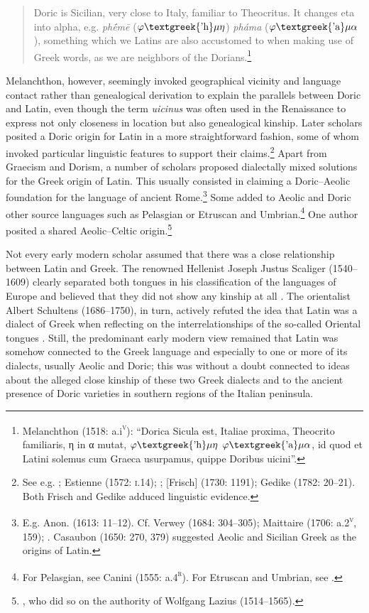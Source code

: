 \documentclass[output=paper]{langsci/langscibook}
\begin{document}
\begin{quote}
Doric is Sicilian, very close to Italy, familiar to Theocritus. It changes eta into alpha, e.g. \textit{phḗmē} ($\varphi \text{\textgreek{'h}}\mu \eta $) \textit{pháma} ($\varphi \text{\textgreek{'a}}\mu \alpha $), something which we Latins are also accustomed to when making use of Greek words, as we are neighbors of the Dorians.\footnote{Melanchthon (1518: a.i\textsc{\textsuperscript{v}}): “Dorica Sicula est, Italiae proxima, Theocrito familiaris, η in α mutat, $\varphi \text{\textgreek{'h}}\mu \eta $ $\varphi \text{\textgreek{'a}}\mu \alpha $, id quod et Latini solemus cum Graeca usurpamus, quippe Doribus uicini”.}
\end{quote}

Melanchthon, however, seemingly invoked geographical vicinity and language contact rather than genealogical derivation to explain the parallels between Doric and Latin, even though the term \textit{uicinus} was often used in the Renaissance to express not only closeness in location but also genealogical kinship. Later scholars posited a Doric origin for Latin in a more straightforward fashion, some of whom invoked particular linguistic features to support their claims.\footnote{See e.g. \citet[10]{Sylvius1531}; Estienne (1572: \textsc{i.}14); \citet[208]{Merula1605}; [Frisch] (1730: 1191); Gedike (1782: 20–21). Both Frisch and Gedike adduced linguistic evidence.} Apart from Graecism and Dorism, a number of scholars proposed dialectally mixed solutions for the Greek origin of Latin. This usually consisted in claiming a Doric–Aeolic foundation for the language of ancient Rome.\footnote{E.g. Anon. (1613: 11–12). Cf. Verwey (1684: 304–305); Maittaire (1706: a.2\textsc{\textsuperscript{v}}, 159); \citet[161]{Gesner1774}. Casaubon (1650: 270, 379) suggested Aeolic and Sicilian Greek as the origins of Latin.} Some added to Aeolic and Doric other source languages such as Pelasgian or Etruscan and Umbrian.\footnote{For Pelasgian, see Canini (1555: a.4\textsc{\textsuperscript{r}}). For Etruscan and Umbrian, see \citet[39]{Rüdiger1782}.} One author posited a shared Aeolic–Celtic origin.\footnote{\citet[13]{Nicolson1715}, who did so on the authority of Wolfgang Lazius (1514–1565).}

Not every early modern scholar assumed that there was a close relationship between Latin and Greek. The renowned Hellenist Joseph Justus Scaliger (1540–1609) clearly separated both tongues in his classification of the languages of Europe and believed that they did not show any kinship at all \citep{Scaliger1610}. The orientalist Albert Schultens (1686–1750), in turn, actively refuted the idea that Latin was a dialect of Greek when reflecting on the interrelationships of the so-called Oriental tongues \citep[109]{Schultens1738b}. Still, the predominant early modern view remained that Latin was somehow connected to the Greek language and especially to one or more of its dialects, usually Aeolic and Doric; this was without a doubt connected to ideas about the alleged close kinship of these two Greek dialects and to the ancient presence of Doric varieties in southern regions of the Italian peninsula.
\end{document}
